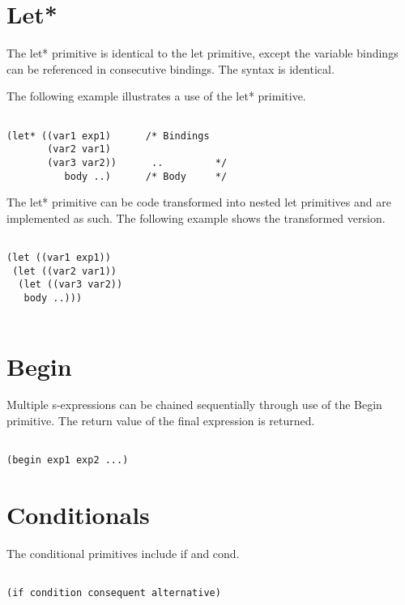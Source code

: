 \documentclass{article}
\begin{document}
\section{Let*}

The let* primitive is identical to the let primitive, except the variable bindings can be referenced in consecutive bindings. The syntax is identical.

The following example illustrates a use of the let* primitive. 

\begin{verbatim}

(let* ((var1 exp1)      /* Bindings
       (var2 var1)     
       (var3 var2))      ..         */
          body ..)      /* Body     */   

\end{verbatim}

The let* primitive can be code transformed into nested let primitives and are implemented as such. The following example shows the transformed version.

\begin{verbatim}

(let ((var1 exp1))
 (let ((var2 var1))
  (let ((var3 var2))
   body ..))) 
 
\end{verbatim}

\section{Begin}

Multiple s-expressions can be chained sequentially through use of the Begin primitive. The return value of the final expression is returned. 

\begin{verbatim}

(begin exp1 exp2 ...) 

\end{verbatim}

\section{Conditionals}

The conditional primitives include if and cond. 

\begin{verbatim}

(if condition consequent alternative)

\end{verbatim}
\end{document}
